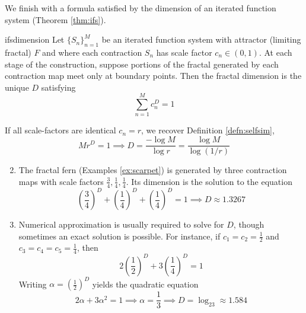 \goodbreak

We finish with a formula satisfied by the dimension of an iterated function system (Theorem \ref{thm:ifs}).

\begin{thm}{}{ifsdimension}
	Let $\{S_n\}_{n=1}^M$ be an iterated function system with attractor (limiting fractal) $F$ and where each contraction $S_n$ has scale factor $c_n\in(0,1)$. At each stage of the construction, suppose portions of the fractal generated by each contraction map meet only at boundary points. Then the fractal dimension is the unique $D$ satisfying
	\[
		\sum_{n=1}^Mc_n^D=1
	\]
\end{thm}

\begin{examples}{}{}
	\exstart If all scale-factors are identical $c_n=r$, we recover Definition \ref{defn:selfsim},
	\[
		Mr^D=1\implies D=\frac{-\log M}{\log r}=\frac{\log M}{\log (1/r)}
	\]
	\begin{enumerate}\setcounter{enumi}{1}
	  \item The fractal fern (Examples \ref{ex:scarpet}) is generated by three contraction maps with scale factors $\frac 34,\frac 14,\frac 14$. Its dimension is the solution to the equation
	  \[
	  	\left(\frac 34\right)^D+\left(\frac 14\right)^D+\left(\frac 14\right)^D=1\implies D\approx 1.3267
	  \]
	  \item Numerical approximation is usually required to solve for $D$, though sometimes an exact solution is possible. For instance, if $c_1=c_2=\frac 12$ and $c_3=c_4=c_5=\frac 14$, then
	  \[
	  	2\left(\frac 12\right)^D+3\left(\frac 14\right)^D=1
	  \]
	  Writing $\alpha=\left(\frac 12\right)^D$ yields the quadratic equation
	  \[
	  	2\alpha+3\alpha^2=1\implies \alpha=\frac 13\implies D=\log_23\approx 1.584
	  \]
	\end{enumerate}
\end{examples}


